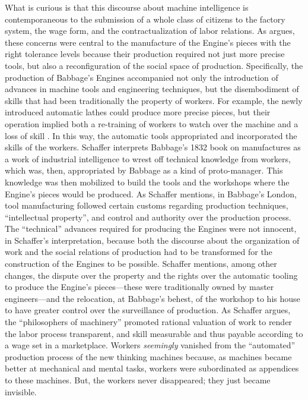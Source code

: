 \documentclass[version=last,draft=false,paper=A4,portrait,twoside=true,twocolumn=false,headinclude=false,footinclude=false,fontsize=12,BCOR=20mm,DIV=calc,pagesize=auto,titlepage=firstiscover,mpinclude=false,open=right,chapterprefix=true,numbers=autoendperiod,headsepline=false,headings=twolinechapter,parskip=false]{scrbook}
\begin{document}
What is curious is that this discourse about machine intelligence is
contemporaneous to the submission of a whole class of citizens to the
factory system, the wage form, and the contractualization of labor
relations. As \textcite{schaffer1994} argues, these concerns were central to
the manufacture of the Engine's pieces with the right tolerance levels
because their production required not just more precise tools, but also a
reconfiguration of the social space of production. Specifically, the
production of Babbage's Engines accompanied not only the introduction of
advances in machine tools and engineering techniques, but the disembodiment
of skills that had been traditionally the property of workers. For example,
the newly introduced automatic lathes could produce more precise pieces,
but their operation implied both a re-training of workers to watch over the
machine and a loss of skill \autocite[214]{schaffer1994}. In this way,
the automatic tools appropriated and incorporated the skills of the
workers. Schaffer interprets Babbage's 1832 book on manufactures as a work
of industrial intelligence to wrest off technical knowledge from workers,
which was, then, appropriated by Babbage as a kind of proto-manager. This
knowledge was then mobilized to build the tools and the workshops where the
Engine's pieces would be produced. As Schaffer mentions, in Babbage's
London, tool manufacturing followed certain customs regarding production
techniques, ``intellectual property'', and control and authority over the
production process. The ``technical'' advances required for producing the
Engines were not innocent, in Schaffer's interpretation, because both the
discourse about the organization of work and the social relations of
production had to be transformed for the construction of the Engines to be
possible. Schaffer mentions, among other changes, the dispute over the
property and the rights over the automatic tooling to produce the Engine's
pieces---these were traditionally owned by master engineers---and the
relocation, at Babbage's behest, of the workshop to his house to have
greater control over the surveillance of production. As Schaffer argues,
the ``philosophers of machinery'' promoted rational valuation of work to
render the labor process transparent, and skill measurable and thus payable
according to a wage set in a marketplace. Workers \emph{seemingly} vanished from
the ``automated'' production process of the new thinking machines because,
as machines became better at mechanical and mental tasks, workers were
subordinated as appendices to these machines. But, the workers never
disappeared; they just became invisible.
\end{document}
